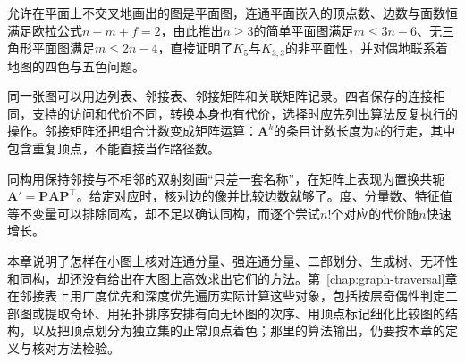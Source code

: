 允许在平面上不交叉地画出的图是平面图，连通平面嵌入的顶点数、边数与面数恒满足欧拉公式$n-m+f=2$，由此推出$n\geq3$的简单平面图满足$m\leq 3n-6$、无三角形平面图满足$m\leq 2n-4$，直接证明了$K_5$与$K_{3,3}$的非平面性，并对偶地联系着地图的四色与五色问题。

同一张图可以用边列表、邻接表、邻接矩阵和关联矩阵记录。四者保存的连接相同，支持的访问和代价不同，转换本身也有代价，选择时应先列出算法反复执行的操作。邻接矩阵还把组合计数变成矩阵运算：$\bm A^k$的条目计数长度为$k$的行走，其中包含重复顶点，不能直接当作路径数。

同构用保持邻接与不相邻的双射刻画“只差一套名称”，在矩阵上表现为置换共轭$\bm A'=\bm P\bm A\bm P^{\top}$。给定对应时，核对边的像并比较边数就够了。度、分量数、特征值等不变量可以排除同构，却不足以确认同构，而逐个尝试$n!$个对应的代价随$n$快速增长。

本章说明了怎样在小图上核对连通分量、强连通分量、二部划分、生成树、无环性和同构，却还没有给出在大图上高效求出它们的方法。第~\ref{chap:graph-traversal}章在邻接表上用广度优先和深度优先遍历实际计算这些对象，包括按层奇偶性判定二部图或提取奇环、用拓扑排序安排有向无环图的次序、用顶点标记细化比较图的结构，以及把顶点划分为独立集的正常顶点着色；那里的算法输出，仍要按本章的定义与核对方法检验。
